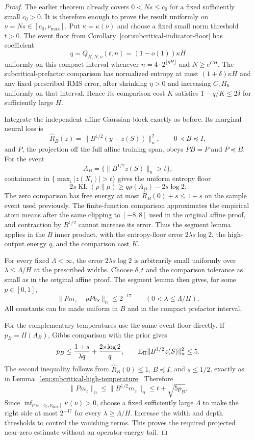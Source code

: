 \begin{proof}
The earlier theorem already covers $0<Ns\le c_0$ for a fixed sufficiently small $c_0>0$. It is therefore enough to prove the result uniformly on $\nu=Ns\in[c_0,\nu_{\max}]$. Put $\kappa=\kappa(\nu)$ and choose a fixed small norm threshold $t>0$. The event floor from Corollary~\ref{cor:subcritical-indicator-floor} has coefficient
\[
 q=Q_{H,N,\nu}(t,n)=(1-o(1))\kappa H
\]
uniformly on this compact interval whenever $n=4\cdot2^{\lfloor\eta H\rfloor}$ and $N\ge e^{CH}$. The subcritical-prefactor comparison has normalized entropy at most $(1+\delta)\kappa H$ and any fixed prescribed RMS error, after shrinking $\eta>0$ and increasing $C,H_0$ uniformly on that interval. Hence its comparison cost $K$ satisfies $1-q/K\le2\delta$ for sufficiently large $H$.

Integrate the independent affine Gaussian block exactly as before. Its marginal neural loss is
\[
 \widehat R_B(z)=\|B^{1/2}(y-z(S))\|_n^2,
 \qquad 0\prec B\preceq I,
\]
and $P$, the projection off the full affine training span, obeys $PB=P$ and $P\preceq B$. For the event
\[
 A_B=\{\|B^{1/2}z(S)\|_n>t\},
\]
containment in $\{\max_i|z(X_i)|>t\}$ gives the uniform entropy floor
\[
 2s\operatorname{KL}(\rho\|\mu)\ge q\rho(A_B)-2s\log2.
\]
The zero comparison has free energy at most $\widehat R_B(0)+s\le1+s$ on the sample event used previously. The finite-function comparison approximates the empirical atom means after the same clipping to $[-8,8]$ used in the original affine proof, and contraction by $B^{1/2}$ cannot increase its error. Thus the segment lemma applies in the $B$ inner product, with the entropy-floor error $2\lambda s\log2$, the high-output energy $q$, and the comparison cost $K$.

For every fixed $\Lambda<\infty$, the error $2\lambda s\log2$ is arbitrarily small uniformly over $\lambda\le\Lambda/H$ at the prescribed widths. Choose $\delta,t$ and the comparison tolerance as small as in the original affine proof. The segment lemma then gives, for some $p\in[0,1]$,
\[
 \|Pm_z-pPb_S\|_n\le2^{-17}
 \qquad(0<\lambda\le\Lambda/H).
\]
All constants can be made uniform in $B$ and in the compact prefactor interval.

For the complementary temperatures use the same event floor directly. If $p_B=\Pi(A_B)$, Gibbs comparison with the prior gives
\[
 p_B\le\frac{1+s}{\lambda q}+\frac{2s\log2}{q},
 \qquad
 \mathbb E_\Pi\|B^{1/2}z(S)\|_n^2\le5.
\]
The second inequality follows from $\widehat R_B(0)\le1$, $B\preceq I$, and $s\le1/2$, exactly as in Lemma~\ref{lem:subcritical-high-temperature}. Therefore
\[
 \|Pm_z\|_n\le\|B^{1/2}m_z\|_n
                  \le t+\sqrt{5p_B}.
\]
Since $\inf_{\nu\in[c_0,\nu_{\max}]}\kappa(\nu)>0$, choose a fixed sufficiently large $\Lambda$ to make the right side at most $2^{-17}$ for every $\lambda\ge\Lambda/H$. Increase the width and depth thresholds to control the vanishing terms. This proves the required projected near-zero estimate without an operator-energy tail.


\end{proof}
